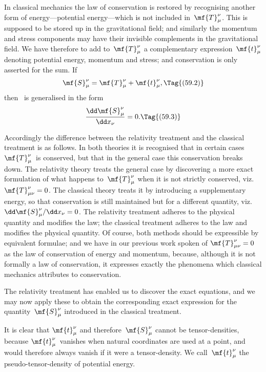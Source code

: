 \documentclass[12pt]{book}
\begin{document}
In classical mechanics the law of conservation is restored by recognising
%
%
another form of energy---potential energy---which is not included in~$\mf{T}_{\mu}^{\nu}$. This
is supposed to be stored up in the gravitational field; and similarly the momentum
and stress components may have their invisible complements in the
gravitational field. We have therefore to add to~$\mf{T}_{\mu}^{\nu}$ a complementary expression~$\mf{t}_{\mu}^{\nu}$
denoting potential energy, momentum and stress; and conservation is only
asserted for the sum. If
\[
\mf{S}_{\mu}^{\nu} = \mf{T}_{\mu}^{\nu} + \mf{t}_{\mu}^{\nu},
\Tag{(59.2)}
\]
then ~is generalised in the form
\[
\frac{\dd\mf{S}_{\mu}^{\nu}}{\dd x_{\nu}} = 0.
\Tag{(59.3)}
\]

Accordingly the difference between the relativity treatment and the
classical treatment is as follows. In both theories it is recognised that in
certain cases $\mf{T}_{\mu}^{\nu}$~is conserved, but that in the general case this conservation
breaks down. The relativity theory treats the general case by discovering a
more exact formulation of what happens to~$\mf{T}_{\mu}^{\nu}$ when it is not strictly conserved,
viz.\ $\mf{T}_{\mu\nu}^{\nu} = 0$. The classical theory treats it by introducing a supplementary
energy, so that conservation is still maintained but for a different quantity,
viz.\ $\dd\mf{S}_{\mu}^{\nu}/\dd x_{\nu} = 0$. The relativity treatment adheres to the physical quantity and
modifies the law; the classical treatment adheres to the law and modifies the
physical quantity. Of course, both methods should be expressible by equivalent
formulae; and we have in our previous work spoken of $\mf{T}_{\mu\nu}^{\nu} = 0$ as the law of
conservation of energy and momentum, because, although it is not formally
a law of conservation, it expresses exactly the phenomena which classical
mechanics attributes to conservation.

The relativity treatment has enabled us to discover the exact equations,
and we may now apply these to obtain the corresponding exact expression for
the quantity~$\mf{S}_{\mu}^{\nu}$ introduced in the classical treatment.

It is clear that $\mf{t}_{\mu}^{\nu}$ and therefore~$\mf{S}_{\mu}^{\nu}$ cannot be tensor-densities, because $\mf{t}_{\mu}^{\nu}$~vanishes
%
when natural coordinates are used at a point, and would therefore
always vanish if it were a tensor-density. We call~$\mf{t}_{\mu}^{\nu}$ the pseudo-tensor-density
of potential energy.
\end{document}
